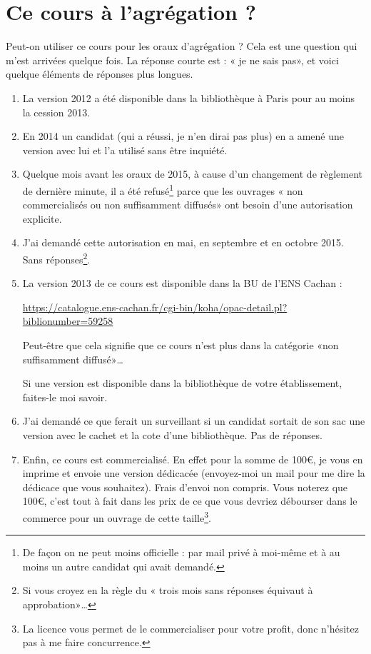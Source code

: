 
\section*{Ce cours à l'agrégation ?}

Peut-on utiliser ce cours pour les oraux d'agrégation ? Cela est une question qui m'est arrivées quelque fois. La réponse courte est : « je ne sais pas», et voici quelque éléments de réponses plus longues.

\begin{enumerate}
    \item
        La version 2012 a été disponible dans la bibliothèque à Paris pour au moins la cession 2013.
    \item
        En 2014 un candidat (qui a réussi, je n'en dirai pas plus) en a amené une version avec lui et l'a utilisé sans être inquiété.
    \item
        Quelque mois avant les oraux de 2015, à cause d'un changement de règlement de dernière minute, il a été refusé\footnote{De façon on ne peut moins officielle : par mail privé à moi-même et à au moins un autre candidat qui avait demandé.} parce que les ouvrages « non commercialisés ou non suffisamment diffusés» ont besoin d'une autorisation explicite.
    \item
        J'ai demandé cette autorisation en mai, en septembre et en octobre 2015. Sans réponses\footnote{Si vous croyez en la règle du « trois mois sans réponses équivaut à approbation»\ldots}.
    \item
        La version 2013 de ce cours est disponible dans la BU de l'ENS Cachan :
        \begin{center}
            \url{https://catalogue.ens-cachan.fr/cgi-bin/koha/opac-detail.pl?biblionumber=59258}
        \end{center}
        Peut-être que cela signifie que ce cours n'est plus dans la catégorie «non suffisamment diffusé»\ldots

        Si une version est disponible dans la bibliothèque de votre établissement, faites-le moi savoir.
    \item
        J'ai demandé ce que ferait un surveillant si un candidat sortait de son sac une version avec le cachet et la cote d'une bibliothèque. Pas de réponses.
    \item
        Enfin, ce cours est commercialisé. En effet pour la somme de 100€, je vous en imprime et envoie une version dédicacée (envoyez-moi un mail pour me dire la dédicace que vous souhaitez). Frais d'envoi non compris. Vous noterez que 100€, c'est tout à fait dans les prix de ce que vous devriez débourser dans le commerce pour un ouvrage de cette taille\footnote{La licence vous permet de le commercialiser pour votre profit, donc n'hésitez pas à me faire concurrence.}.
\end{enumerate}

